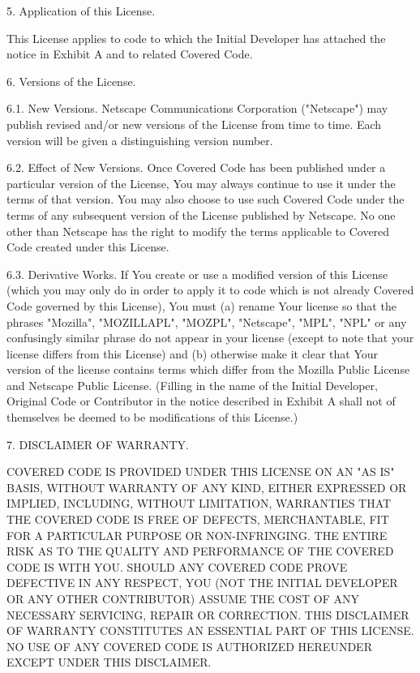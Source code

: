 \begin{DoxyCode}
5. Application of this License.

     This License applies to code to which the Initial Developer has
     attached the notice in Exhibit A and to related Covered Code.

6. Versions of the License.

     6.1. New Versions.
     Netscape Communications Corporation ("Netscape") may publish revised
     and/or new versions of the License from time to time. Each version
     will be given a distinguishing version number.

     6.2. Effect of New Versions.
     Once Covered Code has been published under a particular version of the
     License, You may always continue to use it under the terms of that
     version. You may also choose to use such Covered Code under the terms
     of any subsequent version of the License published by Netscape. No one
     other than Netscape has the right to modify the terms applicable to
     Covered Code created under this License.

     6.3. Derivative Works.
     If You create or use a modified version of this License (which you may
     only do in order to apply it to code which is not already Covered Code
     governed by this License), You must (a) rename Your license so that
     the phrases "Mozilla", "MOZILLAPL", "MOZPL", "Netscape",
     "MPL", "NPL" or any confusingly similar phrase do not appear in your
     license (except to note that your license differs from this License)
     and (b) otherwise make it clear that Your version of the license
     contains terms which differ from the Mozilla Public License and
     Netscape Public License. (Filling in the name of the Initial
     Developer, Original Code or Contributor in the notice described in
     Exhibit A shall not of themselves be deemed to be modifications of
     this License.)

7. DISCLAIMER OF WARRANTY.

     COVERED CODE IS PROVIDED UNDER THIS LICENSE ON AN "AS IS" BASIS,
     WITHOUT WARRANTY OF ANY KIND, EITHER EXPRESSED OR IMPLIED, INCLUDING,
     WITHOUT LIMITATION, WARRANTIES THAT THE COVERED CODE IS FREE OF
     DEFECTS, MERCHANTABLE, FIT FOR A PARTICULAR PURPOSE OR NON-INFRINGING.
     THE ENTIRE RISK AS TO THE QUALITY AND PERFORMANCE OF THE COVERED CODE
     IS WITH YOU. SHOULD ANY COVERED CODE PROVE DEFECTIVE IN ANY RESPECT,
     YOU (NOT THE INITIAL DEVELOPER OR ANY OTHER CONTRIBUTOR) ASSUME THE
     COST OF ANY NECESSARY SERVICING, REPAIR OR CORRECTION. THIS DISCLAIMER
     OF WARRANTY CONSTITUTES AN ESSENTIAL PART OF THIS LICENSE. NO USE OF
     ANY COVERED CODE IS AUTHORIZED HEREUNDER EXCEPT UNDER THIS DISCLAIMER.


\end{DoxyCode}
